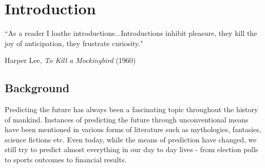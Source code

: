 

\chapter{Introduction} %

\label{Chapter1} %


{``As a reader I loathe introductions...Introductions inhibit pleasure, they kill the joy of
anticipation, they frustrate curiosity."}
\begin{flushright}
Harper Lee, \textit{To Kill a Mockingbird} (1960)
\end{flushright}

\section{Background}
Predicting the future has always been a fascinating topic throughout the history of mankind.
Instances of predicting the future through unconventional means have been mentioned in various
forms of literature such as mythologies, fantasies, science fictions etc. Even today, while the
means of prediction have changed, we still try to predict almost everything in our day to day
lives - from election polls to sports outcomes to financial results.

